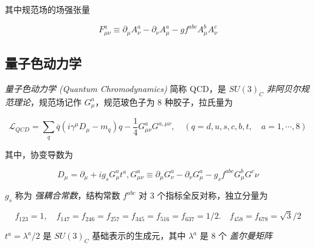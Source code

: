 \documentclass[oneside,a4paper,openany,11pt]{ctexbook}
\begin{document}
其中规范场的场强张量

\begin{equation}
    F_{\mu\nu}^a \equiv \partial_\mu A_\nu^a - \partial_\nu A_\mu^a - g f^{abc} A_\mu^b A_\nu^c
\end{equation}

\subsection{量子色动力学}

\emph{量子色动力学 (Quantum Chromodynamics)} 简称 QCD，是 $SU(3)_C$ \emph{非阿贝尔规范理论}，规范场记作 $G_\mu^a$，规范玻色子为 $8$ 种胶子，拉氏量为

\begin{equation}
    \mathcal{L}_{QCD} = \sum_q \overline{q} (i \gamma^\mu D_\mu - m_q)q - \frac{1}{4} G_{\mu\nu}^a G^{a, \mu\nu}, \quad (q = d, u, s, c, b, t, \quad a = 1, \cdots, 8)
\end{equation}

其中，协变导数为

\begin{equation}
    D_\mu = \partial_\mu + i g_s G^a_\mu t^a, G^a_{\mu\nu} \equiv \partial_\mu G^a_{\nu} - \partial_\nu G^a_\mu - g_s f^{abc}G^b_\mu G^c\nu
\end{equation}

$g_s$ 称为 \emph{强耦合常数}，结构常数 $f^{abc}$ 对 $3$ 个指标全反对称，独立分量为

\begin{equation}
    f_{123} = 1, \quad f_{147} = f_{246} = f_{257} = f_{345} = f_{516} = f_{637} = 1/2. \quad f_{458} = f_{678} = \sqrt{3}/2
\end{equation}

$t^a = \lambda^a / 2$ 是 $SU(3)_C$ 基础表示的生成元，其中 $\lambda^a$ 是 $8$ 个 \emph{盖尔曼矩阵}
\end{document}
